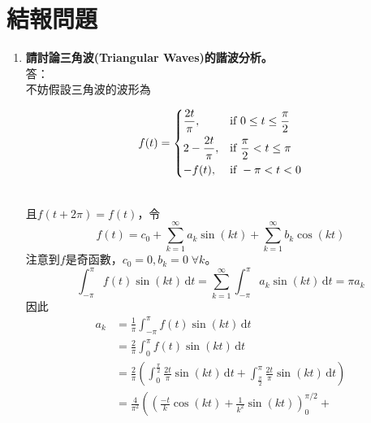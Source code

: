 \documentclass[12pt, a4paper]{article}
\def\large{\fontsize{14}{21}\selectfont}
\newcommand{\dI}{\,\mathrm{d}}
\begin{document}
\section{結報問題}

\begin{enumerate}[itemsep=20pt, topsep=10pt]

  \item {\large\bf 請討論三角波(Triangular Waves)的諧波分析。} \\[10pt]
    答：\\
    不妨假設三角波的波形為 \\
    \begin{minipage}{0.4\textwidth}
      \[
        f(t) = 
        \begin{dcases}
          \frac{2t}{\pi}, & \text{if } 0 \leq t \leq \frac{\pi}{2} \\
          2 - \frac{2t}{\pi}, & \text{if } \frac{\pi}{2} < t \leq \pi  \\
          -f(t), & \text{if } -\pi < t < 0 
        \end{dcases}
      \]
    \end{minipage}
    \quad
    \begin{minipage}{0.4\textwidth}
      \centering
    \end{minipage} \\
    且$f(t + 2 \pi) = f(t)$，令
    \[
      f(t) = c_0 + \sum_{k = 1}^{\infty} a_k \sin(kt) + \sum_{k = 1}^{\infty} b_k \cos(kt)  
    \]
    注意到$f$是奇函數，$c_0 = 0, b_k = 0 \; \forall k$。
    \[
      \int_{-\pi}^{\pi} f(t) \sin(kt) \dI t =  \sum_{k=1}^{\infty}\int_{-\pi}^{\pi} a_k \sin(kt) \dI t = \pi a_k 
    \]
    因此
    \begin{align*}
      a_k &= \frac{1}{\pi} \int_{-\pi}^{\pi} f(t) \sin(kt) \dI t \\
          &= \frac{2}{\pi} \int_{0}^{\pi} f(t) \sin(kt) \dI t \\
          &= \frac{2}{\pi} \left( \int_{0}^{\frac{\pi}{2} } \frac{2t}{\pi}  \sin(kt) \dI t + \int_{\frac{\pi}{2} }^{\pi} \frac{2t}{\pi}  \sin(kt) \dI t \right) \\
          &= \frac{4}{\pi^2} \left( 
      \left( \frac{-t}{k} \cos(kt) + \frac{1}{k^2} \sin(kt) \right)_{0}^{\pi/2} + 

\end{align*}
\end{enumerate}
\end{document}
